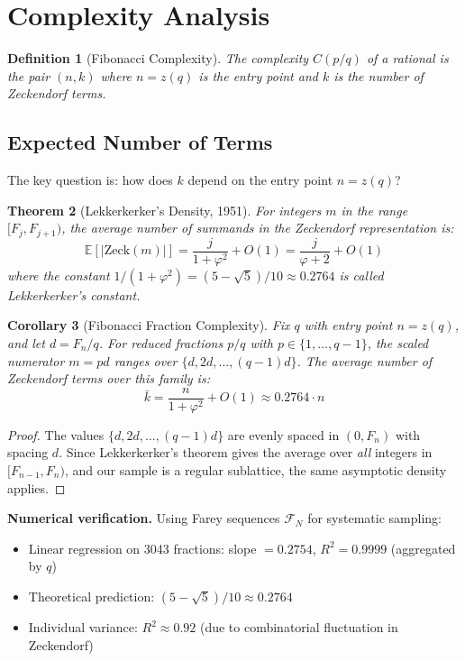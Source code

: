 \documentclass[11pt]{article}
\newtheorem{theorem}{Theorem}
\newtheorem{corollary}[theorem]{Corollary}
\newtheorem{definition}[theorem]{Definition}
\begin{document}
\section{Complexity Analysis}

\begin{definition}[Fibonacci Complexity]
The complexity $C(p/q)$ of a rational is the pair $(n, k)$ where $n = z(q)$ is the entry point and $k$ is the number of Zeckendorf terms.
\end{definition}

\subsection{Expected Number of Terms}

The key question is: how does $k$ depend on the entry point $n = z(q)$?

\begin{theorem}[Lekkerkerker's Density, 1951]
\label{thm:lekkerkerker}
For integers $m$ in the range $[F_j, F_{j+1})$, the average number of summands in the Zeckendorf representation is:
\[
\mathbb{E}[|\mathrm{Zeck}(m)|] = \frac{j}{1 + \varphi^2} + O(1) = \frac{j}{\varphi + 2} + O(1)
\]
where the constant $1/(1+\varphi^2) = (5-\sqrt{5})/10 \approx 0.2764$ is called \emph{Lekkerkerker's constant}.
\end{theorem}

\begin{corollary}[Fibonacci Fraction Complexity]
\label{cor:complexity}
Fix $q$ with entry point $n = z(q)$, and let $d = F_n/q$. For reduced fractions $p/q$ with $p \in \{1, \ldots, q-1\}$, the scaled numerator $m = pd$ ranges over $\{d, 2d, \ldots, (q-1)d\}$. The average number of Zeckendorf terms over this family is:
\[
\bar{k} = \frac{n}{1 + \varphi^2} + O(1) \approx 0.2764 \cdot n
\]
\end{corollary}

\begin{proof}
The values $\{d, 2d, \ldots, (q-1)d\}$ are evenly spaced in $(0, F_n)$ with spacing $d$. Since Lekkerkerker's theorem gives the average over \emph{all} integers in $[F_{n-1}, F_n)$, and our sample is a regular sublattice, the same asymptotic density applies.
\end{proof}

\textbf{Numerical verification.} Using Farey sequences $\mathcal{F}_N$ for systematic sampling:
\begin{itemize}
    \item Linear regression on 3043 fractions: slope $= 0.2754$, $R^2 = 0.9999$ (aggregated by $q$)
    \item Theoretical prediction: $(5-\sqrt{5})/10 \approx 0.2764$
    \item Individual variance: $R^2 \approx 0.92$ (due to combinatorial fluctuation in Zeckendorf)
\end{itemize}
\end{document}
